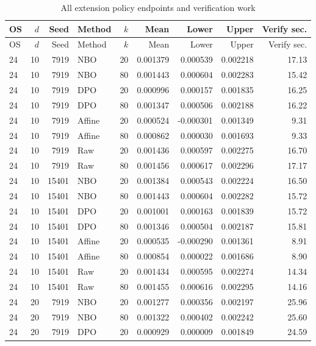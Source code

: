 \begingroup\small\setlength{\tabcolsep}{3pt}
\begin{longtable}{lrrlrrrrr}
\caption{All extension policy endpoints and verification work}\label{tab:r14policyall}\\
\toprule
OS & $d$ & Seed & Method & $k$ & Mean & Lower & Upper & Verify sec.\\\midrule
\endfirsthead
\toprule
OS & $d$ & Seed & Method & $k$ & Mean & Lower & Upper & Verify sec.\\\midrule
\endhead
24 & 10 & 7919 & NBO & 20 & 0.001379 & 0.000539 & 0.002218 & 17.13\\
24 & 10 & 7919 & NBO & 80 & 0.001443 & 0.000604 & 0.002283 & 15.42\\
24 & 10 & 7919 & DPO & 20 & 0.000996 & 0.000157 & 0.001835 & 16.25\\
24 & 10 & 7919 & DPO & 80 & 0.001347 & 0.000506 & 0.002188 & 16.22\\
24 & 10 & 7919 & Affine & 20 & 0.000524 & -0.000301 & 0.001349 & 9.31\\
24 & 10 & 7919 & Affine & 80 & 0.000862 & 0.000030 & 0.001693 & 9.33\\
24 & 10 & 7919 & Raw & 20 & 0.001436 & 0.000597 & 0.002275 & 16.70\\
24 & 10 & 7919 & Raw & 80 & 0.001456 & 0.000617 & 0.002296 & 17.17\\
24 & 10 & 15401 & NBO & 20 & 0.001384 & 0.000543 & 0.002224 & 16.50\\
24 & 10 & 15401 & NBO & 80 & 0.001443 & 0.000604 & 0.002282 & 15.72\\
24 & 10 & 15401 & DPO & 20 & 0.001001 & 0.000163 & 0.001839 & 15.72\\
24 & 10 & 15401 & DPO & 80 & 0.001346 & 0.000504 & 0.002187 & 15.81\\
24 & 10 & 15401 & Affine & 20 & 0.000535 & -0.000290 & 0.001361 & 8.91\\
24 & 10 & 15401 & Affine & 80 & 0.000854 & 0.000022 & 0.001686 & 8.90\\
24 & 10 & 15401 & Raw & 20 & 0.001434 & 0.000595 & 0.002274 & 14.34\\
24 & 10 & 15401 & Raw & 80 & 0.001455 & 0.000616 & 0.002295 & 14.16\\
24 & 20 & 7919 & NBO & 20 & 0.001277 & 0.000356 & 0.002197 & 25.96\\
24 & 20 & 7919 & NBO & 80 & 0.001322 & 0.000402 & 0.002242 & 25.60\\
24 & 20 & 7919 & DPO & 20 & 0.000929 & 0.000009 & 0.001849 & 24.59\\

\end{longtable}

